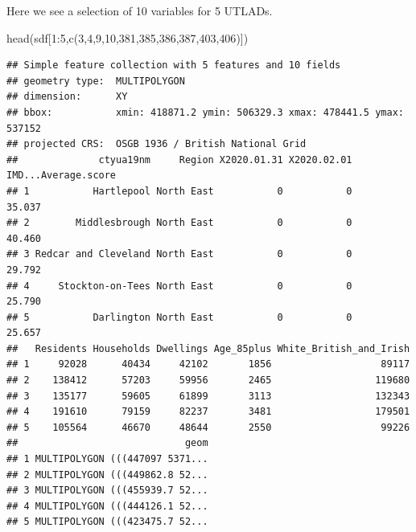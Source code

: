 \documentclass[
]{book}
\newenvironment{Shaded}{\begin{snugshade}}{\end{snugshade}}
\newcommand{\DecValTok}[1]{\textcolor[rgb]{0.00,0.00,0.81}{#1}}
\newcommand{\FunctionTok}[1]{\textcolor[rgb]{0.00,0.00,0.00}{#1}}
\newcommand{\NormalTok}[1]{#1}
\newcommand{\SpecialCharTok}[1]{\textcolor[rgb]{0.00,0.00,0.00}{#1}}
\begin{document}
Here we see a selection of 10 variables for 5 UTLADs.

\begin{Shaded}
\begin{Highlighting}[]
\FunctionTok{head}\NormalTok{(sdf[}\DecValTok{1}\SpecialCharTok{:}\DecValTok{5}\NormalTok{,}\FunctionTok{c}\NormalTok{(}\DecValTok{3}\NormalTok{,}\DecValTok{4}\NormalTok{,}\DecValTok{9}\NormalTok{,}\DecValTok{10}\NormalTok{,}\DecValTok{381}\NormalTok{,}\DecValTok{385}\NormalTok{,}\DecValTok{386}\NormalTok{,}\DecValTok{387}\NormalTok{,}\DecValTok{403}\NormalTok{,}\DecValTok{406}\NormalTok{)])}
\end{Highlighting}
\end{Shaded}

\begin{verbatim}
## Simple feature collection with 5 features and 10 fields
## geometry type:  MULTIPOLYGON
## dimension:      XY
## bbox:           xmin: 418871.2 ymin: 506329.3 xmax: 478441.5 ymax: 537152
## projected CRS:  OSGB 1936 / British National Grid
##              ctyua19nm     Region X2020.01.31 X2020.02.01 IMD...Average.score
## 1           Hartlepool North East           0           0              35.037
## 2        Middlesbrough North East           0           0              40.460
## 3 Redcar and Cleveland North East           0           0              29.792
## 4     Stockton-on-Tees North East           0           0              25.790
## 5           Darlington North East           0           0              25.657
##   Residents Households Dwellings Age_85plus White_British_and_Irish
## 1     92028      40434     42102       1856                   89117
## 2    138412      57203     59956       2465                  119680
## 3    135177      59605     61899       3113                  132343
## 4    191610      79159     82237       3481                  179501
## 5    105564      46670     48644       2550                   99226
##                             geom
## 1 MULTIPOLYGON (((447097 5371...
## 2 MULTIPOLYGON (((449862.8 52...
## 3 MULTIPOLYGON (((455939.7 52...
## 4 MULTIPOLYGON (((444126.1 52...
## 5 MULTIPOLYGON (((423475.7 52...
\end{verbatim}
\end{document}
